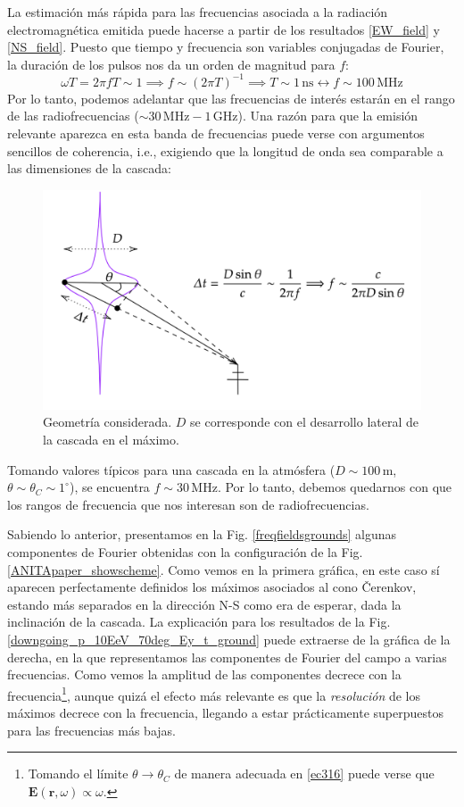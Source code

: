 \documentclass[12 pt, a4paper]{article} %
\numberwithin{equation}{section}
\numberwithin{figure}{section}
\numberwithin{table}{section}
\newcommand{\vect}[1]{\boldsymbol{\mathbf{#1}}}
\begin{document}
La estimación más rápida para las frecuencias asociada a la radiación electromagnética emitida puede hacerse a partir de los resultados \ref{EW_field} y \ref{NS_field}. Puesto que tiempo y frecuencia son variables conjugadas de Fourier, la duración de los pulsos nos da un orden de magnitud para $f$:
\begin{equation}
	\omega T = 2\pi f T \sim 1\implies f\sim \left(2\pi T\right)^{-1} \implies T \sim 1 \,\mathrm{ns} \leftrightarrow f \sim 100 \,\mathrm{MHz}\label{ec317}
\end{equation} 
Por lo tanto, podemos adelantar que las frecuencias de interés estarán en el rango de las radiofrecuencias ($\sim30\,\mathrm{MHz}-1\,\mathrm{GHz}$). Una razón para que la emisión relevante aparezca en esta banda de frecuencias puede verse con argumentos sencillos de coherencia, i.e., exigiendo que la longitud de onda sea comparable a las dimensiones de la cascada:
	\begin{figure}[H]
		\centering
		\includegraphics[width=.6\linewidth]{figures/radio/coherence}
		\caption{Geometría considerada. $D$ se corresponde con el desarrollo lateral de la cascada en el máximo.}
		\label{coherence}
	\end{figure}
Tomando valores típicos para una cascada en la atmósfera ($D\sim 100\,\mathrm{m}$, $\theta\sim\theta_C\sim1^\circ$), se encuentra $f\sim30\,\mathrm{MHz}$. Por lo tanto, debemos quedarnos con que los rangos de frecuencia que nos interesan son de radiofrecuencias.

Sabiendo lo anterior, presentamos en la Fig. \ref{freqfieldsgrounds} algunas componentes de Fourier obtenidas con la configuración de la Fig. \ref{ANITApaper_showscheme}. Como vemos en la primera gráfica, en este caso sí aparecen perfectamente definidos los máximos asociados al cono \v{C}erenkov, estando más separados en la dirección N-S como era de esperar, dada la inclinación de la cascada. La explicación para los resultados de la Fig. \ref{downgoing_p_10EeV_70deg_Ey_t_ground} puede extraerse de la gráfica de la derecha, en la que representamos las componentes de Fourier del campo a varias frecuencias. Como vemos la amplitud de las componentes decrece con la frecuencia\footnote{ Tomando el límite $\theta\rightarrow\theta_C$ de manera adecuada en \eqref{ec316} puede verse que $\vect{E}\left(\vect{r},\omega\right)\propto\omega$.}, aunque quizá el efecto más relevante es que la \textit{resolución} de los máximos decrece con la frecuencia, llegando a estar prácticamente superpuestos para las frecuencias más bajas. 
\end{document}
